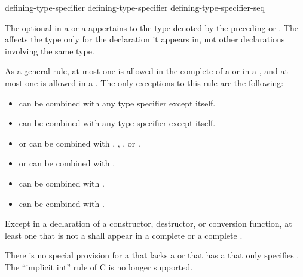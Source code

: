 \begin{bnf}
\br
  defining-type-specifier \br
  defining-type-specifier defining-type-specifier-seq
\end{bnf}

The optional  in a 
or a 
appertains
to the type denoted by the preceding 
or . The
 affects the type only for the declaration it appears in,
not other declarations involving the same type.

\pnum
As a general rule, at most one
is allowed in the complete
 of a  or in a
,
and at most one
is allowed in a
.
The only exceptions to this rule are the following:
\begin{itemize}
\item {} can be combined with any type specifier except itself.

\item {} can be combined with any type specifier except itself.

\item {} or  can be combined with
, , , or .

\item {} or  can be combined with .

\item {} can be combined with .

\item {} can be combined with .
\end{itemize}

\pnum
Except in a declaration of a constructor, destructor, or conversion
function, at least one  that is not a
 shall appear in a complete
 or a complete
.
\begin{footnote}
There is no special
provision for a  that
lacks a  or that has a
 that only specifies .
The ``implicit int'' rule of C is no longer supported.
\end{footnote}

